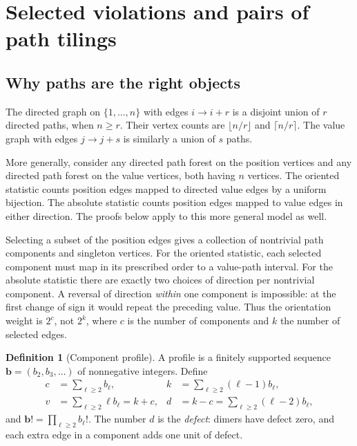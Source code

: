 \documentclass[11pt]{article}
\numberwithin{equation}{section}
\theoremstyle{definition}
\newtheorem{definition}[theorem]{Definition}
\theoremstyle{remark}
\theoremstyle{definition}
\newcommand{\bfac}{\mathbf b!}
\begin{document}
\section{Selected violations and pairs of path tilings}
\label{spf:sec:tilings}

\subsection{Why paths are the right objects}

The directed graph on $\{1,\ldots,n\}$ with edges $i\to i+r$ is a disjoint union
of $r$ directed paths, when $n\ge r$. Their vertex counts are
$\lfloor n/r\rfloor$ and $\lceil n/r\rceil$. The value graph with edges
$j\to j+s$ is similarly a union of $s$ paths.

More generally, consider any directed path forest on the position vertices and
any directed path forest on the value vertices, both having $n$ vertices.
The oriented statistic counts position edges mapped to directed value edges by
a uniform bijection. The absolute statistic counts position edges mapped to
value edges in either direction. The proofs below apply to this more general
model as well.

Selecting a subset of the position edges gives a collection of nontrivial path
components and singleton vertices. For the oriented statistic, each selected
component must map in its prescribed order to a value-path interval. For the
absolute statistic there are exactly two choices of direction per nontrivial
component. A reversal of direction \emph{within} one component is impossible:
at the first change of sign it would repeat the preceding value. Thus the
orientation weight is $2^c$, not $2^k$, where $c$ is the number of components
and $k$ the number of selected edges.

\begin{definition}[Component profile]
A profile is a finitely supported sequence
$\mathbf b=(b_2,b_3,\ldots)$ of nonnegative integers. Define
\begin{equation}
 \begin{aligned}
 c&=\sum_{\ell\ge2}b_\ell,&
 k&=\sum_{\ell\ge2}(\ell-1)b_\ell,\\
 v&=\sum_{\ell\ge2}\ell b_\ell=k+c,&
 d&=k-c=\sum_{\ell\ge2}(\ell-2)b_\ell,
 \end{aligned}
 \label{spf:eq:profile}
\end{equation}
and $\bfac=\prod_{\ell\ge2}b_\ell!$.
The number $d$ is the \emph{defect}: dimers have defect zero, and each extra
edge in a component adds one unit of defect.
\end{definition}
\end{document}
